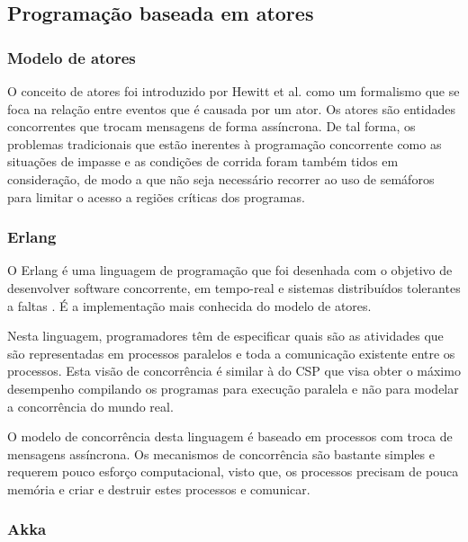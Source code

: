 \subsection{Programação baseada em atores}
\label{sec:actors}

\subsubsection{Modelo de atores}
\label{sec:actor-model}
O conceito de atores foi introduzido por Hewitt et al. \cite{Hewitt:StructuresAsPatternsOfPassingMessages} como um formalismo que se foca na relação entre eventos que é causada por um ator. Os atores são entidades concorrentes que trocam mensagens de forma assíncrona. De tal forma, os problemas tradicionais que estão inerentes à programação concorrente como as situações de impasse e as condições de corrida foram também tidos em consideração, de modo a que não seja necessário recorrer ao uso de semáforos para limitar o acesso a regiões críticas dos programas. %

\subsubsection{Erlang}
O Erlang é uma linguagem de programação que foi desenhada com o objetivo de desenvolver software concorrente, em tempo-real e sistemas distribuídos tolerantes a faltas \cite{Armstrong:ErlangBook}. É a implementação mais conhecida do modelo de atores.

Nesta linguagem, programadores têm de especificar quais são as atividades que são representadas em processos paralelos e toda a comunicação existente entre os processos. Esta visão de concorrência é similar à do CSP \cite{Hoare:CSP} que visa obter o máximo desempenho compilando os programas para execução paralela e não para modelar a concorrência do mundo real.

O modelo de concorrência desta linguagem é baseado em processos com troca de mensagens assíncrona. Os mecanismos de concorrência são bastante simples e requerem pouco esforço computacional, visto que, os processos precisam de pouca memória e criar e destruir estes processos e comunicar.

\subsubsection{Akka}


